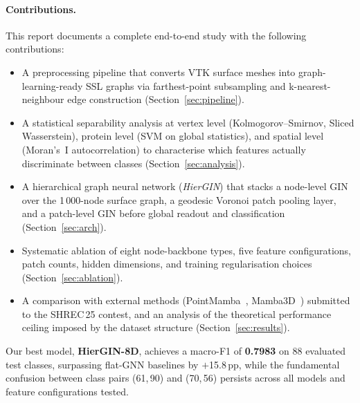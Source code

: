 \paragraph{Contributions.}
This report documents a complete end-to-end study with the following
contributions:
\begin{itemize}
  \item A preprocessing pipeline that converts VTK surface meshes into
        graph-learning-ready SSL graphs via farthest-point subsampling and
        k-nearest-neighbour edge construction
        (Section~\ref{sec:pipeline}).

  \item A statistical separability analysis at vertex level (Kolmogorov--Smirnov,
        Sliced Wasserstein), protein level (SVM on global statistics), and
        spatial level (Moran's~I autocorrelation) to characterise which
        features actually discriminate between classes
        (Section~\ref{sec:analysis}).

  \item A hierarchical graph neural network (\textit{HierGIN}) that stacks a
        node-level GIN over the 1\,000-node surface graph, a geodesic Voronoi
        patch pooling layer, and a patch-level GIN before global readout and
        classification (Section~\ref{sec:arch}).

  \item Systematic ablation of eight node-backbone types, five feature
        configurations, patch counts, hidden dimensions, and training
        regularisation choices (Section~\ref{sec:ablation}).

  \item A comparison with external methods (PointMamba~\cite{pointmamba},
        Mamba3D~\cite{mamba3d}) submitted to the SHREC\,25 contest, and an
        analysis of the theoretical performance ceiling imposed by the dataset
        structure (Section~\ref{sec:results}).
\end{itemize}

Our best model, \textbf{HierGIN-8D}, achieves a macro-F1 of \textbf{0.7983}
on 88 evaluated test classes, surpassing flat-GNN baselines by $+$15.8\,pp,
while the fundamental confusion between class pairs (61,\,90) and (70,\,56)
persists across all models and feature configurations tested.
